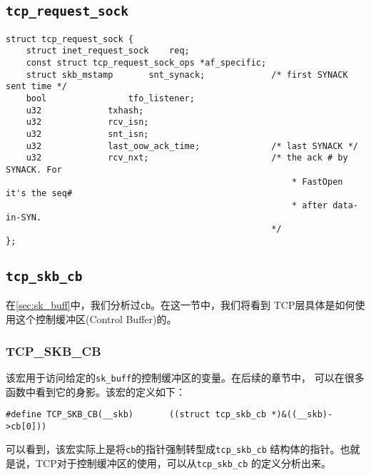         \subsection{\texttt{tcp_request_sock}}
\begin{verbatim}
struct tcp_request_sock {
    struct inet_request_sock    req;
    const struct tcp_request_sock_ops *af_specific;
    struct skb_mstamp       snt_synack; 			/* first SYNACK sent time */
    bool                tfo_listener;
    u32             txhash;
    u32             rcv_isn;
    u32             snt_isn;
    u32             last_oow_ack_time; 				/* last SYNACK */
    u32             rcv_nxt; 						/* the ack # by SYNACK. For
                          								* FastOpen it's the seq#
                         								* after data-in-SYN.
                          							*/
};
\end{verbatim}
        \subsection{\texttt{tcp_skb_cb}}
\label{sec:tcp_skb_cb}

在\ref{sec:sk_buff}中，我们分析过\texttt{cb}。在这一节中，我们将看到
TCP层具体是如何使用这个控制缓冲区(Control Buffer)的。

            \subsubsection{TCP\_SKB\_CB}
\label{subsec:tcp_skb_cb}

该宏用于访问给定的\texttt{sk_buff}的控制缓冲区的变量。在后续的章节中，
可以在很多函数中看到它的身影。该宏的定义如下：

\begin{verbatim}
#define TCP_SKB_CB(__skb)       ((struct tcp_skb_cb *)&((__skb)->cb[0]))
\end{verbatim}

可以看到，该宏实际上是将\texttt{cb}的指针强制转型成\texttt{tcp_skb_cb}
结构体的指针。也就是说，TCP对于控制缓冲区的使用，可以从\texttt{tcp_skb_cb}
的定义分析出来。

